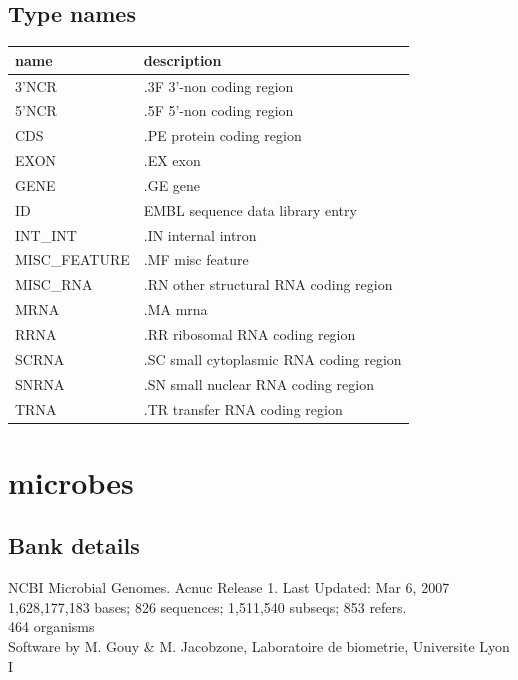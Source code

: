 \documentclass{article}
\begin{document}
\begin{Schunk}
\subsection{Type names}
\noindent\begin{tabular}{ll}
\hline \hline
name & description\\
\hline
3'NCR & .3F  3'-non coding region \\
5'NCR & .5F  5'-non coding region \\
CDS & .PE protein coding region \\
EXON & .EX exon \\
GENE & .GE gene \\
ID & EMBL sequence data library entry \\
INT\_INT & .IN  internal intron \\
MISC\_FEATURE & .MF misc feature \\
MISC\_RNA & .RN other structural RNA coding region \\
MRNA & .MA mrna \\
RRNA & .RR ribosomal RNA coding region \\
SCRNA & .SC small cytoplasmic RNA coding region \\
SNRNA & .SN small nuclear RNA coding region \\
TRNA & .TR transfer RNA coding region \\
\hline \hline
\end{tabular}

\section{ microbes }
\subsection{Bank details}
NCBI Microbial Genomes. Acnuc Release 1. Last Updated: Mar  6, 2007\\
1,628,177,183 bases; 826 sequences; 1,511,540 subseqs; 853 refers.\\
464 organisms\\
Software by M. Gouy \& M. Jacobzone, Laboratoire de biometrie, Universite Lyon I


\end{Schunk}
\end{document}
